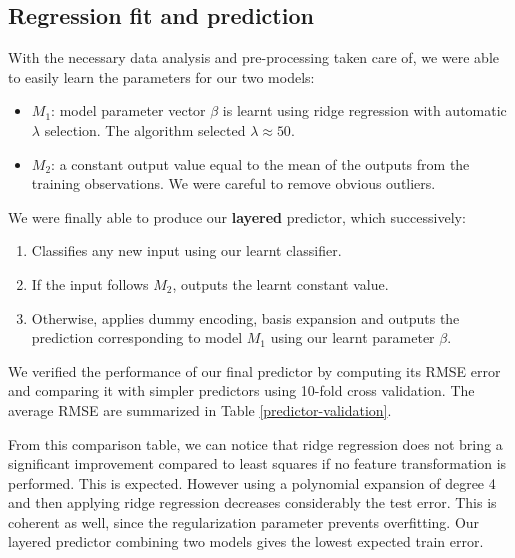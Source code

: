 \documentclass{article} %
\begin{document}
  \subsection{Regression fit and prediction} \label{regression-fit}
  With the necessary data analysis and pre-processing taken care of, we were able to easily learn the parameters for our two models:
  \begin{itemize}
    \item $M_1$: model parameter vector $\beta$ is learnt using ridge regression with automatic $\lambda$ selection. The algorithm selected $\lambda \approx 50$.
    \item $M_2$: a constant output value equal to the mean of the outputs from the training observations. We were careful to remove obvious outliers.
  \end{itemize}

  We were finally able to produce our \textbf{layered} predictor, which successively:
  \begin{enumerate}
    \item Classifies any new input using our learnt classifier.
    \item If the input follows $M_2$, outputs the learnt constant value.
    \item Otherwise, applies dummy encoding, basis expansion and outputs the prediction corresponding to model $M_1$ using our learnt parameter $\beta$.
  \end{enumerate}

  We verified the performance of our final predictor by computing its RMSE error and comparing it with simpler predictors using 10-fold cross validation. The average RMSE are summarized in Table \ref{predictor-validation}.

  From this comparison table, we can notice that ridge regression does not bring a significant improvement compared to least squares if no feature transformation is performed. This is expected. However using a polynomial expansion of degree 4 and then applying ridge regression decreases considerably the test error. This is coherent as well, since the regularization parameter prevents overfitting. Our layered predictor combining two models gives the lowest expected train error.
\end{document}
